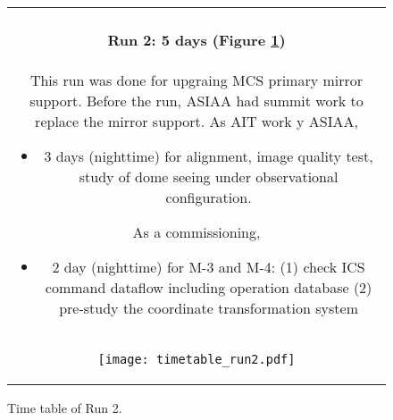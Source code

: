 \begin{figure}[!ht]
\begin{center}
\begin{tabular}{c}
\begin{minipage}{0.95\hsize}
\paragraph{Run 2: 5 days (Figure \ref{fig:run2})}
This run was done for upgraing MCS primary mirror support. 
Before the run, ASIAA had summit work to replace the mirror support. 
As AIT work y ASIAA,
	\begin{itemize}
 	\item 3 days (nighttime) for alignment, image quality test, study of dome seeing under observational configuration.
	\end{itemize}
As a commissioning,
	\begin{itemize}
 	\item 2 day (nighttime) for M-3 and M-4: 
	(1) check ICS command dataflow including operation database
	(2) pre-study the coordinate transformation system
	\end{itemize}
\end{minipage} \\
\begin{minipage}{0.8\hsize}
	\begin{center}
	\vspace*{5mm}
	\texttt{[image: timetable\_run2.pdf]}
	\end{center}
	\vspace*{-5mm}
	\caption{Time table of Run 2.}
	\label{fig:run2}
\end{minipage}
\end{tabular}
\end{center}
\end{figure}

